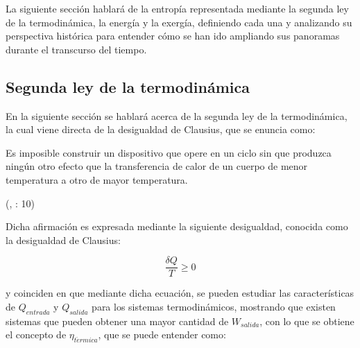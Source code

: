 La siguiente sección hablará de la entropía representada mediante la segunda ley de la termodinámica, la energía y la exergía, definiendo cada una y analizando su perspectiva histórica para entender cómo se han ido ampliando sus panoramas durante el transcurso del tiempo.

\subsection{Segunda ley de la termodinámica}

En la siguiente sección se hablará acerca de la segunda ley de la termodinámica, la cual viene directa de la desigualdad de Clausius, que se enuncia como:

\begin{center}
    \begin{minipage}{0.9\linewidth}
        \vspace{5pt}%
        {\small
            Es imposible construir un dispositivo que opere en un ciclo sin que produzca ningún otro efecto que la transferencia de calor de un cuerpo de menor temperatura a otro de mayor temperatura.
        }
        \begin{flushright}
            (\citeauthor{clau1}, \citeyear{clau1}: 10)
        \end{flushright}
        \vspace{5pt}%
    \end{minipage}
\end{center}

Dicha afirmación es expresada mediante la siguiente desigualdad, conocida como la desigualdad de Clausius:

\begin{equation}
    \frac{\delta Q}{T} \geq 0
\end{equation}

\textcite{burghardt1984ingenieria} y \textcite{ccengel2006termodinamica} coinciden en que mediante dicha ecuación, se pueden estudiar las características de \( Q_{entrada} \) y \( Q_{salida} \) para los sistemas termodinámicos, mostrando que existen sistemas que pueden obtener una mayor cantidad de \( W_{salida} \), con lo que se obtiene el concepto de \( \eta_{t \acute{e}rmica } \), que se puede entender como:

